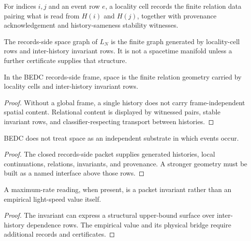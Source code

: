 \begin{definition}
\label{def:philosophy-inter-system-locality-cell}
For indices \(i,j\) and an event row \(e\), a locality cell records the
finite relation data pairing what is read from \(H(i)\) and \(H(j)\),
together with provenance acknowledgement and history-sameness stability
witnesses.
\end{definition}

\begin{definition}
\label{def:philosophy-records-side-space-graph}
The records-side space graph of \(L_N\) is the finite graph generated
by locality-cell rows and inter-history invariant rows. It is not a
spacetime manifold unless a further certificate supplies that
structure.
\end{definition}

\begin{theorem}
\label{thm:philosophy-space-locality-cell-geometry}
In the BEDC records-side frame, space is the finite relation geometry
carried by locality cells and inter-history invariant rows.
\end{theorem}
\begin{proof}
Without a global frame, a single history does not carry
frame-independent spatial content. Relational content is displayed by
witnessed pairs, stable invariant rows, and classifier-respecting
transport between histories.
\end{proof}

\begin{corollary}
\label{cor:philosophy-space-not-event-substrate}
BEDC does not treat space as an independent substrate in which events
occur.
\end{corollary}
\begin{proof}
The closed records-side packet supplies generated histories, local
continuations, relations, invariants, and provenance. A stronger
geometry must be built as a named interface above those rows.
\end{proof}

\begin{corollary}
\label{cor:philosophy-maximum-rate-schema-surface}
A maximum-rate reading, when present, is a packet invariant rather than
an empirical light-speed value itself.
\end{corollary}
\begin{proof}
The invariant can express a structural upper-bound surface over
inter-history dependence rows. The empirical value and its physical
bridge require additional records and certificates.
\end{proof}

